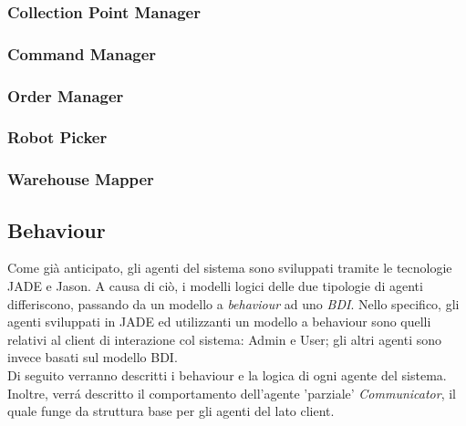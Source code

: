 \subsubsection{Collection Point Manager}
\subsubsection{Command Manager}
\subsubsection{Order Manager}
\subsubsection{Robot Picker}
\subsubsection{Warehouse Mapper}

\subsection{Behaviour}


Come già anticipato, gli agenti del sistema sono sviluppati tramite le tecnologie JADE e Jason. A causa di ciò, i modelli logici delle due tipologie di agenti differiscono, passando da un modello a \textit{behaviour} ad uno \textit{BDI}. Nello specifico, gli agenti sviluppati in JADE ed utilizzanti un modello a behaviour sono quelli relativi al client di interazione col sistema: Admin e User; gli altri agenti sono invece basati sul modello BDI.\\
Di seguito verranno descritti i behaviour e la logica di ogni agente del sistema. Inoltre, verr\'a descritto il comportamento dell'agente 'parziale' \textit{Communicator}, il quale funge da struttura base per gli agenti del lato client.

